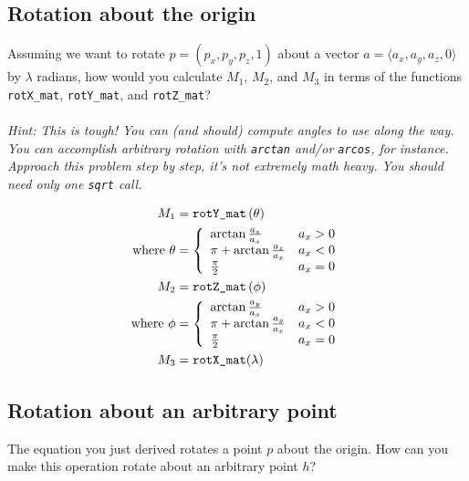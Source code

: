 \documentclass[10pt,twocolumn]{article}
\begin{document}
\subsection{Rotation about the origin}
\begin{framed}
\noindent{\bf [1.5 points]} Assuming we want to rotate $p=(p_x,p_y,p_z,1)$ about a vector $a = \langle a_x,a_y,a_z,0\rangle$ by $\lambda$ radians, how would you calculate $M_1$, $M_2$, and $M_3$ in terms of the functions {\tt rotX\_mat}, {\tt rotY\_mat}, and {\tt rotZ\_mat}?\\\\
\emph{Hint: This is tough! You can (and should) compute angles to use along the way. You can accomplish arbitrary rotation with {\tt arctan} and/or {\tt arcos}, for instance. Approach this problem step by step, it's not extremely math heavy. You should need only one {\tt sqrt} call.}
\end{framed}

\begin{framed}
\begin{align*}
M_1 &= \text{\tt{rotY\_mat}} \left(\theta\right) \\ \text{where } 
  \theta &= \left\{
    \begin{array}{l l} \arctan \frac{a_z}{a_x} & a_x > 0 \\
                       \pi + \arctan \frac{a_z}{a_x} & a_x < 0 \\
                       \frac{\pi}{2} & a_x = 0
        \end{array} 
  \right. \\
M_2 &= \text{\tt{rotZ\_mat}} \left(\phi\right) \\ \text{where } 
  \phi &= \left\{
    \begin{array}{l l} \arctan \frac{a_y}{a_x} & a_x > 0 \\
                       \pi + \arctan \frac{a_y}{a_x} & a_x < 0 \\
                       \frac{\pi}{2} & a_x = 0
        \end{array} 
  \right.\\
M_3 &= \text{\tt{rotX\_mat}} (\lambda)
\end{align*}
\end{framed}


\subsection{Rotation about an arbitrary point}
\begin{framed}
\noindent{\bf [1 point]} The equation you just derived rotates a point $p$ about the origin. How can you make this operation rotate about an arbitrary point $h$?
\end{framed}
\end{document}
